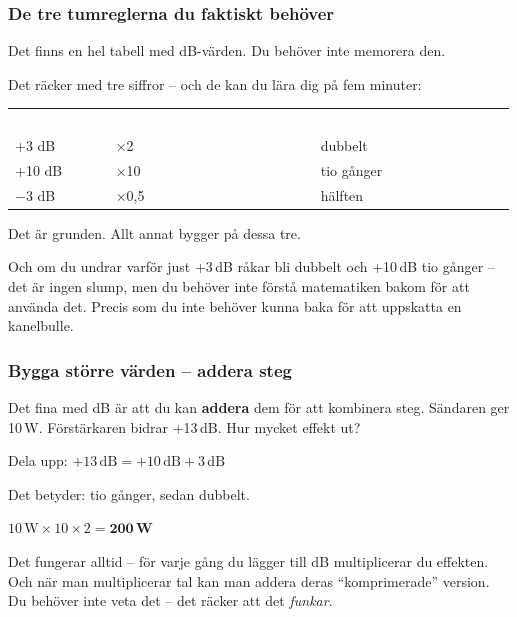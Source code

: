 \documentclass[a4paper,11pt,twoside]{book}
\newcommand{\tblhdr}[1]{\cellcolor{greydark}\textcolor{white}{\headingfont\bfseries\footnotesize\MakeUppercase{#1}}}
\begin{document}
\subsubsection*{De tre tumreglerna du faktiskt behöver}

Det finns en hel tabell med dB-värden. Du behöver inte memorera den. 

Det räcker med tre siffror -- och de kan du lära dig på fem minuter:

\begin{center}
\begin{tabular}{lll}
\rowcolor{greydark}
\tblhdr{dB-värde} & \tblhdr{Effektförhållande} & \tblhdr{Kom ihåg det som\ldots} \\
+3 dB  & ×2   & dubbelt \\
\rowcolor{greylight}
+10 dB & ×10  & tio gånger \\
$-$3 dB  & ×0,5 & hälften \\
\end{tabular}
\end{center}

Det är grunden. Allt annat bygger på dessa tre.

\medskip

Och om du undrar varför just +3\,dB råkar bli dubbelt och +10\,dB tio gånger -- det är ingen slump, men du behöver inte förstå matematiken bakom för att använda det. Precis som du inte behöver kunna baka för att uppskatta en kanelbulle.

\subsubsection*{Bygga större värden -- addera steg}

Det fina med dB är att du kan \textbf{addera} dem för att kombinera steg. Sändaren ger 10\,W. Förstärkaren bidrar +13\,dB. Hur mycket effekt ut?

Dela upp: $+13\,\text{dB} = +10\,\text{dB} + 3\,\text{dB}$

Det betyder: tio gånger, sedan dubbelt.

$10\,\text{W} \times 10 \times 2 = \mathbf{200\,\text{W}}$

\medskip

Det fungerar alltid -- för varje gång du lägger till dB multiplicerar du effekten. Och när man multiplicerar tal kan man addera deras ``komprimerade'' version. Du behöver inte veta det -- det räcker att det \emph{funkar}.
\end{document}
